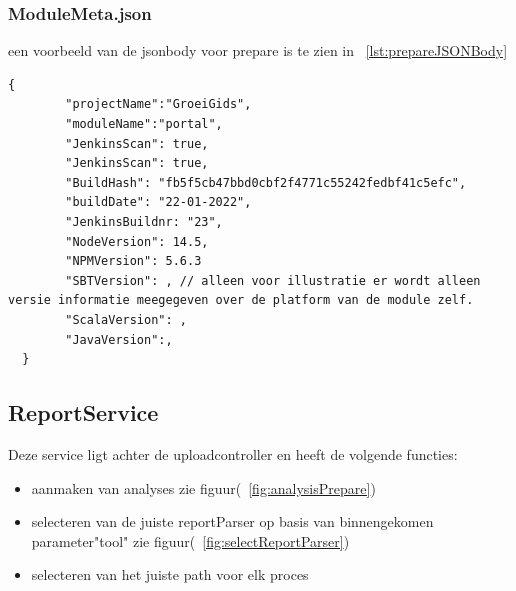 \subsubsection{ModuleMeta.json}
een voorbeeld van de jsonbody voor prepare is te zien in ~\ref{lst:prepareJSONBody}
\begin{lstlisting}[caption={Datamodel vanuit Jenkins},label=lst:prepareJSONBody]
    {
        "projectName":"GroeiGids",
        "moduleName":"portal",
        "JenkinsScan": true,
        "JenkinsScan": true,
        "BuildHash": "fb5f5cb47bbd0cbf2f4771c55242fedbf41c5efc",
        "buildDate": "22-01-2022",
        "JenkinsBuildnr: "23",
        "NodeVersion": 14.5,
        "NPMVersion": 5.6.3
        "SBTVersion": , // alleen voor illustratie er wordt alleen versie informatie meegegeven over de platform van de module zelf.
        "ScalaVersion": ,
        "JavaVersion":,
  }
\end{lstlisting}

\subsection{ReportService}\label{subsec:reportservice}
Deze service ligt achter de uploadcontroller en heeft de volgende functies:
\begin{itemize}
    \item aanmaken van analyses zie figuur(~\ref{fig:analysisPrepare})
    \item selecteren van de juiste reportParser op basis van binnengekomen parameter"tool" zie figuur(~\ref{fig:selectReportParser})
    \item selecteren van het juiste path voor elk proces
\end{itemize}


